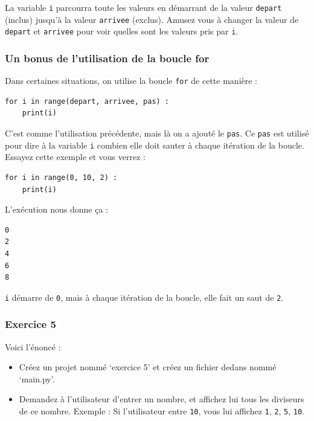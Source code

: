 \documentclass[12pt]{article}
\newcommand{\code}[1]{\colorbox{light-gray}{\texttt{#1}}}
\begin{document}
            La variable \code{i} parcourra toute les valeurs en démarrant de la valeur \code{depart} (inclus)
            jusqu'à la valeur \code{arrivee} (exclus). Amusez vous à changer la valeur de \code{depart}
            et \code{arrivee} pour voir quelles sont les valeurs pris par \code{i}.

        \subsubsection{Un bonus de l'utilisation de la boucle for}

            Dans certaines situations, on utilise la boucle \code{for} de cette manière :
            \begin{lstlisting}[style=code]
for i in range(depart, arrivee, pas) :
    print(i)
            \end{lstlisting}

            C'est comme l'utilisation précédente, mais là on a ajouté le \code{pas}. Ce \code{pas} est utilisé pour dire à
            la variable \code{i} combien elle doit sauter à chaque itération de la boucle. Essayez cette exemple et vous
            verrez :
            \begin{lstlisting}[style=code]
for i in range(0, 10, 2) :
    print(i)
            \end{lstlisting}

            L'exécution nous donne ça :
            \begin{lstlisting}[style=exec_result]
0
2
4
6
8
            \end{lstlisting}

            \code{i} démarre de \code{0}, mais à chaque itération de la boucle, elle fait un saut de \code{2}.

        \subsubsection{Exercice 5}
            Voici l'énoncé :
            \begin{itemize}
                \item Créez un projet nommé `exercice 5' et créez un fichier dedans nommé `main.py'.
                \item Demandez à l'utilisateur d'entrer un nombre, et affichez lui tous les diviseurs de ce nombre.
                    Exemple : Si l'utilisateur entre \code{10}, vous lui affichez \code{1}, \code{2}, \code{5}, \code{10}.
            \end{itemize}
\end{document}
